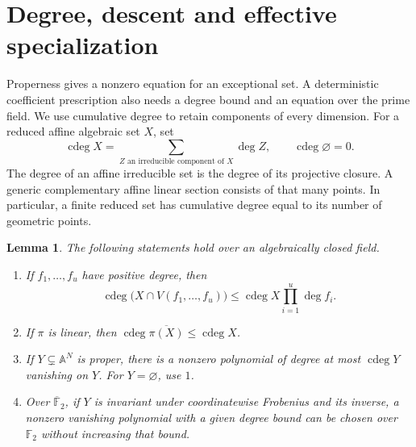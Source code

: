 \documentclass[11pt,a4paper]{article}
\newcommand{\F}{\mathbb F}
\newcommand{\A}{\mathbb A}
\DeclareMathOperator{\cdeg}{cdeg}
\newtheorem{lemma}[theorem]{Lemma}
\theoremstyle{definition}
\theoremstyle{remark}
\numberwithin{equation}{section}
\begin{document}
\section{Degree, descent and effective specialization}\label{sec:algebra}
Properness gives a nonzero equation for an exceptional set. A deterministic coefficient prescription also needs a degree bound and an equation over the prime field. We use cumulative degree to retain components of every dimension. For a reduced affine algebraic set $X$, set
\[
\cdeg X=\sum_{Z\text{ an irreducible component of }X}\deg Z,
\qquad \cdeg\varnothing=0.
\]
The degree of an affine irreducible set is the degree of its projective closure. A generic complementary affine linear section consists of that many points. In particular, a finite reduced set has cumulative degree equal to its number of geometric points.

\begin{lemma}\label{lem:degree}
The following statements hold over an algebraically closed field.
\begin{enumerate}
\item If $f_1,\ldots,f_u$ have positive degree, then
\begin{equation}\label{eq:bezout}
\cdeg\bigl(X\cap V(f_1,\ldots,f_u)\bigr)\le\cdeg X\prod_{i=1}^u\deg f_i.
\end{equation}
\item If $\pi$ is linear, then $\cdeg\overline{\pi(X)}\le\cdeg X$.
\item If $Y\subsetneq\A^N$ is proper, there is a nonzero polynomial of degree at most $\cdeg Y$ vanishing on $Y$. For $Y=\varnothing$, use $1$.
\item Over $\overline{\F}_2$, if $Y$ is invariant under coordinatewise Frobenius and its inverse, a nonzero vanishing polynomial with a given degree bound can be chosen over $\F_2$ without increasing that bound.
\end{enumerate}
\end{lemma}
\end{document}
